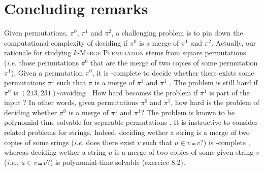 \section{Concluding remarks}
\label{section:Concluding remarks}

Given permutations, $\pi^0$, $\pi^1$ and $\pi^2$, 
a challenging problem is to pin down the computational complexity of deciding 
if $\pi^0$ is a merge of $\pi^1$ and $\pi^2$.
Actually, our rationale for studying \textsc{$k$-Merge Permutation} stems
from square permutations (\emph{i.e.} those permutations $\pi^0$ that are the merge 
of two copies of some permutation $\pi^1$).
Given a permutation $\pi^0$, it is \NP-complete to decide
whether there exists some permutations $\pi^1$ such that
$\pi$ is a merge of $\pi^1$ and $\pi^1$ \cite{DBLP:journals/tcs/GiraudoV18}.
The problem is still hard if $\pi^0$ is $(213,231)$-avoiding \cite{DBLP:journals/tcs/GiraudoV18,DBLP:journals/tcs/BulteauV20}.
How hard becomes the problem if $\pi^1$ is part of the input ?
In other words, given permutations $\pi^0$ and $\pi^1$, how hard is the problem
of deciding whether $\pi^0$ is a merge of $\pi^1$ and $\pi^1$?
The problem is known to be polynomial-time solvable for separable permutations \cite{DBLP:conf/spire/NeouRV16}.
It is instructive to consider related problems for strings.
Indeed, deciding wether a string is a merge of two copies of some srings 
(\emph{i.e.} does there exist $v$ such that $u \in v \shuffle v$?) is \NP-complete
\cite{DBLP:journals/jcss/BussS14,RIZZI2017}, whereas
deciding wether a string $u$ is a merge of two copies of some given string $v$ 
(\emph{i.e.}, $u \in v \shuffle v$?) is 
polynomial-time solvable \cite{skienna08} (exercice 8.2).


